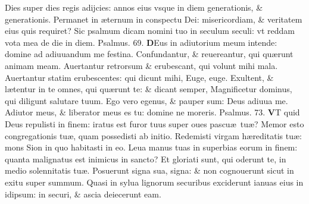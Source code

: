 \documentclass[a5paper,10pt]{book}
\def\ae{æ}
\begin{document}
\begin{multicols*}{2}
\newline \color{red} D\color{black}ies super dies regis adijcies: annos eius vsque in diem generationis, \& generationis.
\newline \color{red} P\color{black}ermanet in \ae ternum in conspectu Dei: misericordiam, \& veritatem eius quis requiret?
\newline \color{red} S\color{black}ic psalmum dicam nomini tuo in seculum seculi: vt reddam vota mea de die in diem. \quad \color{red} Psalmus. \hypertarget{ps69}{69.} \color{black}
\vspace{-.5em}
\lettrine[lines=2]{\bfseries \color{red} D}{}Eus in adiutorium meum intende: domine ad adiuuandum me festina.
\newline \color{red} C\color{black}onfundantur, \& reuereantur, qui qu\ae runt animam meam.
\newline \color{red} A\color{black}uertantur retrorsum \& erubescant, qui volunt mihi mala.
\newline \color{red} A\color{black}uertantur statim erubescentes: qui dicunt mihi, Euge, euge.
\newline \color{red} E\color{black}xultent, \& l\ae tentur in te omnes, qui qu\ae runt te: \& dicant semper, Magnificetur dominus, qui diligunt salutare tuum.
\newline \color{red} E\color{black}go vero egenus, \& pauper sum: Deus adiuua me.
\newline \color{red} A\color{black}diutor meus, \& liberator meus es tu: domine ne moreris. \quad \color{red} Psalmus. \hypertarget{ps73}{73.} \color{black}
\vspace{-.5em}
\lettrine[lines=2]{\bfseries \color{red} V}{}T quid Deus repulisti in finem: iratus est furor tuus super oues pascu\ae \ tu\ae ?
\newline \color{red} M\color{black}emor esto congregationis tu\ae , quam possedisti ab initio.
\newline \color{red} R\color{black}edemisti virgam h\ae reditatis tu\ae : mons Sion in quo habitasti in eo.
\newline \color{red} L\color{black}eua manus tuas in superbias eorum in finem: quanta malignatus est inimicus in sancto?
\newline \color{red} E\color{black}t gloriati sunt, qui oderunt te, in medio solennitatis tu\ae .
\newline \color{red} P\color{black}osuerunt signa sua, signa: \& non cognouerunt sicut in exitu super summum.
\newline \color{red} Q\color{black}uasi in sylua lignorum securibus exciderunt ianuas eius in idipsum: in securi, \& ascia deiecerunt eam.

\end{multicols*}
\end{document}
